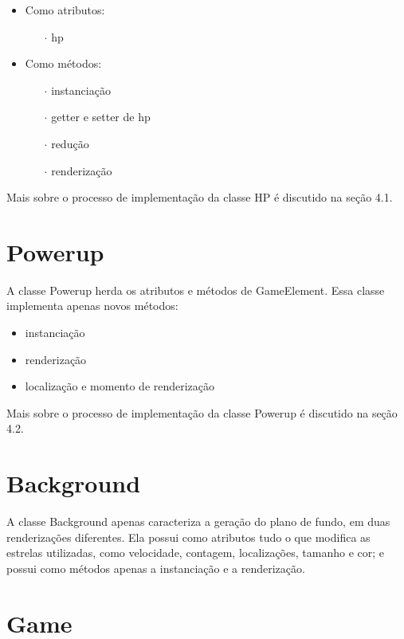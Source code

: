 \documentclass[
	12pt,				%
	oneside,			%
	a4paper,			%
	english,			%
	brazil				%
	]{abntex2ppgsi}
\begin{document}
\begin{itemize}
    \item Como atributos:
    \begin{itemize}
        \item[$\cdot$] hp
    \end{itemize}
    \item Como métodos:
    \begin{itemize}
        \item[$\cdot$] instanciação
        \item[$\cdot$] getter e setter de hp
        \item[$\cdot$] redução
        \item[$\cdot$] renderização
    \end{itemize}
\end{itemize}

Mais sobre o processo de implementação da classe HP é discutido na seção 4.1.

\section{Powerup}

A classe Powerup herda os atributos e métodos de GameElement. Essa classe implementa apenas novos métodos:

\begin{itemize}
    \item instanciação
    \item renderização
    \item localização e momento de renderização
\end{itemize}

Mais sobre o processo de implementação da classe Powerup é discutido na seção 4.2.

\section{Background}

A classe Background apenas caracteriza a geração do plano de fundo, em duas renderizações diferentes. Ela possui como atributos tudo o que modifica as estrelas utilizadas, como velocidade, contagem, localizações, tamanho e cor; e possui como métodos apenas a instanciação e a renderização.

\section{Game}
\end{document}
